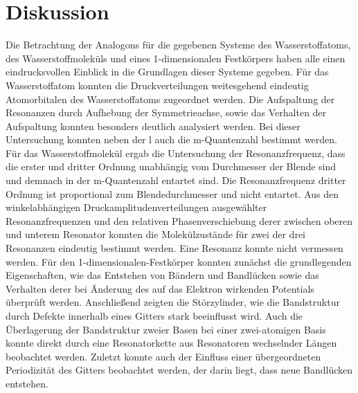 \newpage
\section{Diskussion}
    Die Betrachtung der Analogons für die gegebenen Systeme des Wasserstoffatoms, des Wasserstoffmoleküls und eines 1-dimensionalen Festkörpers haben alle einen eindrucksvollen Einblick in die Grundlagen 
    dieser Systeme gegeben. Für das Wasserstoffatom konnten die Druckverteilungen weitesgehend eindeutig Atomorbitalen des Wasserstoffatoms zugeordnet werden. Die Aufspaltung der Resonanzen durch Aufhebung 
    der Symmetrieachse, sowie das Verhalten der Aufspaltung konnten besonders deutlich analysiert werden. Bei dieser Untersuchung konnten neben der l auch die m-Quantenzahl bestimmt werden.\newline
    Für das Wasserstoffmolekül ergab die Untersuchung der Resonanzfrequenz, dass die erster und dritter Ordnung unabhängig vom Durchmesser der Blende sind und demnach in der m-Quantenzahl entartet sind. Die 
    Resonanzfrequenz dritter Ordnung ist proportional zum Blendedurchmesser und nicht entartet. Aus den winkelabhängigen Druckamplitudenverteilungen ausgewählter Resonanzfrequenzen und den relativen 
    Phasenverschiebung derer zwischen oberen und unterem Resonator konnten die Molekülzustände für zwei der drei Resonanzen eindeutig bestimmt werden. Eine Resonanz konnte nicht vermessen werden.\newline
    Für den 1-dimensionalen-Festkörper konnten zunächst die grundlegenden Eigenschaften, wie das Entstehen von Bändern und Bandlücken sowie das Verhalten derer bei Änderung des auf das Elektron wirkenden
    Potentials überprüft werden. Anschließend zeigten die Störzylinder, wie die Bandstruktur durch Defekte innerhalb eines Gitters stark beeinflusst wird. Auch die Überlagerung der Bandstruktur zweier Basen 
    bei einer zwei-atomigen Basis konnte direkt durch eine Resonatorkette aus Resonatoren wechselnder Längen beobachtet werden. Zuletzt konnte auch der Einfluss einer übergeordneten Periodizität des Gitters 
    beobachtet werden, der darin liegt, dass neue Bandlücken entstehen.  